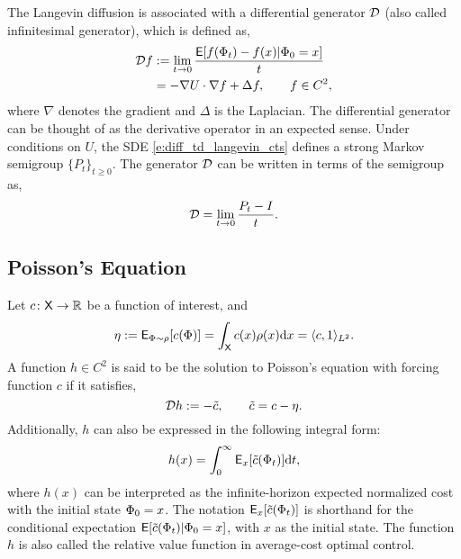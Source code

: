 The Langevin diffusion is associated with a differential generator ${\cal D}$ (also called infinitesimal generator), which is defined as,
\begin{equation}
\begin{aligned}
\generate f &:= \lim_{t \to 0} \frac{\Expect [ f(\markovstate_t) - f(x) | \markovstate_0 = x]}{t} \\
& = -\nabla \pot \cdot \nabla f + \Delta f,\qquad f\in C^2,
\label{e:diff_td_langevin_generator}
\end{aligned}
\end{equation}
where $\nabla$ denotes the gradient and $\Delta$ is the Laplacian. The differential generator can be thought of as the derivative operator in an expected sense. Under conditions on $U$, the SDE \eqref{e:diff_td_langevin_cts} defines a strong Markov semigroup $\{P_t\}_{t \geq 0}$. The generator ${\cal D}$ can be written in terms of the semigroup as,
\begin{equation}
\generate = \lim_{t \to 0} \frac{P_t - I}{t}.
\label{e:diff_td_langevin_semigroup}
\end{equation}
\subsection{Poisson's Equation}
Let $c \colon {\sf X} \to \mathbb{R}$ be a function of interest, and 
\begin{equation}
\eta := {\sf E}_{\Phi \sim \rho}[c(\Phi)] =  \int_{\sf X} c(x) \rho(x) \text{d} x = \langle c, 1 \rangle_{L^2}.
\end{equation}
A function $h\in C^2$ is said to be the solution to Poisson's equation with forcing function $c$ if it satisfies,
\begin{equation}
\generate h := - \tilc, \qquad  \tilc = c - \eta.
\label{e:diff_td_poissons}
\end{equation}
Additionally, $h$ can also be expressed in the following integral form:
\begin{equation}
h(x) =\int_0^\infty {\sf E}_x[\tilde c(\Phi_t)] \text{d} t,
\end{equation}
where $h(x)$ can be interpreted as the infinite-horizon expected normalized cost with the initial state $\Phi_0 = x$. The notation ${\sf E}_x[\tilde c(\Phi_t)]$ is shorthand for the conditional expectation ${\sf E}[\tilde c(\Phi_t)|\Phi_0 = x]$, with $x$ as the initial state. The function $h$ is also called the relative value function in average-cost optimal control.  

